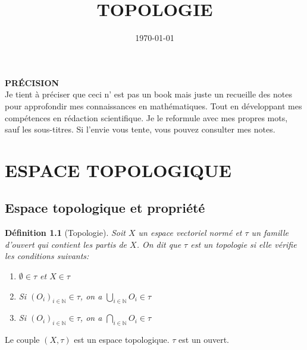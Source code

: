 \documentclass[a4paper, 12pt]{report}
\title{TOPOLOGIE}
\date{\today}
\author{}
\theoremstyle{break}
\newtheorem{defin}{Définition}[section]
\begin{document}
\maketitle

\textbf{PRÉCISION}\\
Je tient à préciser que ceci n' est pas un book mais juste un recueille des notes pour approfondir mes connaissances en mathématiques. 
Tout en développant mes compétences en rédaction scientifique.
Je le reformule avec mes propres mots, sauf les sous-titres.
Si l'envie vous tente, vous pouvez consulter mes notes.

\tableofcontents

\chapter{ESPACE TOPOLOGIQUE}

\section{Espace topologique et propriété}
\begin{defin}[Topologie]
Soit $X$ un espace vectoriel normé et $\tau$ un famille d'ouvert qui contient les partis de $X$.
On dit que $\tau$ est un topologie si elle vérifie les conditions suivants:
\begin{enumerate}
	\item $\emptyset \in \tau$  et $X \in \tau$
	\item Si $(O_{i})_{i \in \mathbb{N}} \in \tau$, on a $\bigcup_{i \in \mathbb{N}} O_{i} \in \tau$
	\item Si $(O_{i})_{i \in \mathbb{N}} \in \tau$, on a $\bigcap_{i \in \mathbb{N}} O_{i} \in \tau$
\end{enumerate}
\end{defin}
Le couple $(X, \tau)$ est un espace topologique. $\tau$ est un ouvert.
\end{document}
